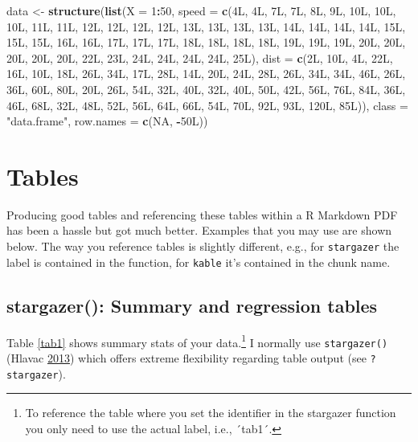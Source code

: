 \documentclass[12pt,]{article}
\newenvironment{Shaded}{\begin{snugshade}}{\end{snugshade}}
\newcommand{\KeywordTok}[1]{\textcolor[rgb]{0.13,0.29,0.53}{\textbf{#1}}}
\newcommand{\DataTypeTok}[1]{\textcolor[rgb]{0.13,0.29,0.53}{#1}}
\newcommand{\DecValTok}[1]{\textcolor[rgb]{0.00,0.00,0.81}{#1}}
\newcommand{\StringTok}[1]{\textcolor[rgb]{0.31,0.60,0.02}{#1}}
\newcommand{\OtherTok}[1]{\textcolor[rgb]{0.56,0.35,0.01}{#1}}
\newcommand{\OperatorTok}[1]{\textcolor[rgb]{0.81,0.36,0.00}{\textbf{#1}}}
\newcommand{\NormalTok}[1]{#1}
\let\rmarkdownfootnote\footnote%
\def\footnote{\protect\rmarkdownfootnote}
\theoremstyle{definition}
\theoremstyle{definition}
\theoremstyle{definition}
\theoremstyle{remark}
\begin{document}
\begin{Shaded}
\begin{Highlighting}[]
\NormalTok{data <-}\StringTok{ }\KeywordTok{structure}\NormalTok{(}\KeywordTok{list}\NormalTok{(}\DataTypeTok{X =} \DecValTok{1}\OperatorTok{:}\DecValTok{50}\NormalTok{, }\DataTypeTok{speed =} \KeywordTok{c}\NormalTok{(4L, 4L, 7L, 7L, 8L, 9L, 10L, }
\NormalTok{10L, 10L, 11L, 11L, 12L, 12L, 12L, 12L, 13L, 13L, 13L, 13L, 14L, }
\NormalTok{14L, 14L, 14L, 15L, 15L, 15L, 16L, 16L, 17L, 17L, 17L, 18L, 18L, }
\NormalTok{18L, 18L, 19L, 19L, 19L, 20L, 20L, 20L, 20L, 20L, 22L, 23L, 24L, }
\NormalTok{24L, 24L, 24L, 25L), }\DataTypeTok{dist =} \KeywordTok{c}\NormalTok{(2L, 10L, 4L, 22L, 16L, 10L, 18L, }
\NormalTok{26L, 34L, 17L, 28L, 14L, 20L, 24L, 28L, 26L, 34L, 34L, 46L, 26L, }
\NormalTok{36L, 60L, 80L, 20L, 26L, 54L, 32L, 40L, 32L, 40L, 50L, 42L, 56L, }
\NormalTok{76L, 84L, 36L, 46L, 68L, 32L, 48L, 52L, 56L, 64L, 66L, 54L, 70L, }
\NormalTok{92L, 93L, 120L, 85L)), }
\DataTypeTok{class =} \StringTok{"data.frame"}\NormalTok{, }\DataTypeTok{row.names =} \KeywordTok{c}\NormalTok{(}\OtherTok{NA}\NormalTok{, }
\OperatorTok{-}\NormalTok{50L))}
\end{Highlighting}
\end{Shaded}

\section{Tables}\label{sec:tables}

Producing good tables and referencing these tables within a R Markdown
PDF has been a hassle but got much better. Examples that you may use are
shown below. The way you reference tables is slightly different, e.g.,
for \texttt{stargazer} the label is contained in the function, for
\texttt{kable} it's contained in the chunk name.

\subsection{stargazer(): Summary and regression
tables}\label{stargazer-summary-and-regression-tables}

Table \ref{tab1} shows summary stats of your data.\footnote{To reference
  the table where you set the identifier in the stargazer function you
  only need to use the actual label, i.e., ´tab1´.} I normally use
\texttt{stargazer()} (Hlavac
\protect\hyperlink{ref-hlavac2013stargazer}{2013}) which offers extreme
flexibility regarding table output (see \texttt{?stargazer}).
\end{document}
